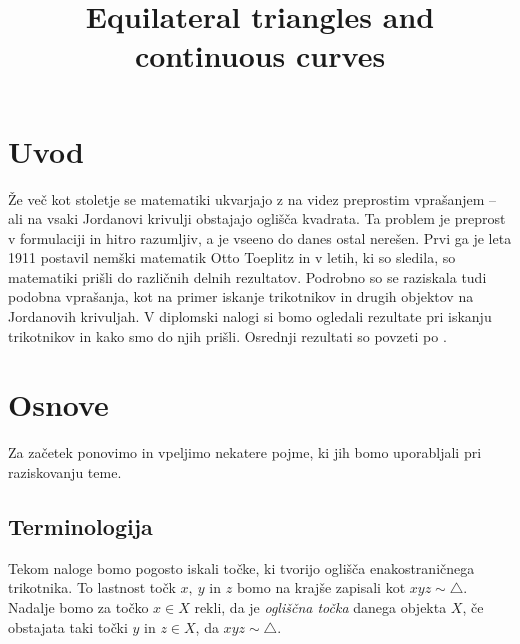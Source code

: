 \documentclass[mat1]{fmfdelo}
\title{Equilateral triangles and continuous curves}
\begin{document}
\section{Uvod}
Že več kot stoletje se matematiki ukvarjajo z na videz preprostim vprašanjem -- ali na vsaki Jordanovi krivulji obstajajo oglišča kvadrata. Ta problem je preprost v formulaciji in hitro razumljiv, a je vseeno do danes ostal nerešen. Prvi ga je leta 1911 postavil nemški matematik Otto Toeplitz \cite{splet_idaho} in v letih, ki so sledila, so matematiki prišli do različnih delnih rezultatov. Podrobno so se raziskala tudi podobna vprašanja, kot na primer iskanje trikotnikov in drugih objektov na Jordanovih krivuljah. V diplomski nalogi si bomo ogledali rezultate pri iskanju trikotnikov in kako smo do njih prišli. Osrednji rezultati so povzeti po \cite{clanek_meyerson}.

\section{Osnove}

Za začetek ponovimo in vpeljimo nekatere pojme, ki jih bomo uporabljali pri raziskovanju teme.

\subsection{Terminologija}

Tekom naloge bomo pogosto iskali točke, ki tvorijo oglišča enakostraničnega trikotnika. To lastnost točk $x,\ y$ in $z$ bomo na krajše zapisali kot $xyz \sim \triangle$. Nadalje bomo za točko $x \in X$ rekli, da je \emph{ogliščna točka} danega objekta $X$, če obstajata taki točki $y$ in $z \in X$, da $xyz \sim \triangle$.
\end{document}
